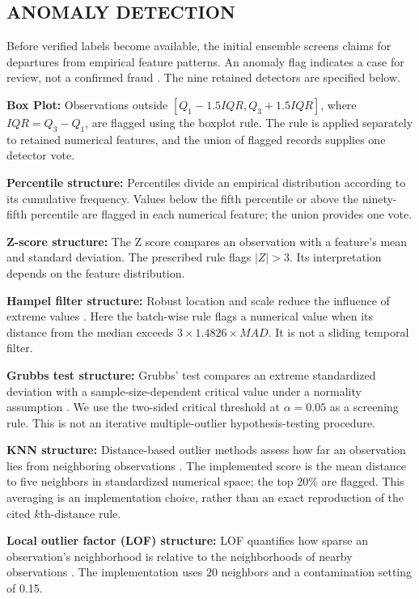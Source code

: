 \subsection*{ANOMALY DETECTION}\label{SSC:AD}
Before verified labels become available, the initial ensemble screens
claims for departures from empirical feature patterns. An anomaly flag
indicates a case for review, not a confirmed fraud \citep{Chandola2009}.
The nine retained detectors are specified below.

\textbf{Box Plot:} Observations outside
$[Q_1-1.5IQR,Q_3+1.5IQR]$, where $IQR=Q_3-Q_1$, are flagged
using the boxplot rule. The rule is applied separately to retained numerical
features, and the union of flagged records supplies one detector vote.

\textbf{Percentile structure:} Percentiles divide an empirical distribution
according to its cumulative frequency. Values below the fifth percentile
or above the ninety-fifth percentile are flagged in each numerical feature;
the union provides one vote.

\textbf{Z-score structure:} The Z score compares an observation with a
feature's mean and standard deviation. The prescribed rule flags
$|Z|>3$. Its interpretation depends on the feature distribution.

\textbf{Hampel filter structure:} Robust location and scale reduce the
influence of extreme values \citep{Hampel1974}. Here the batch-wise rule
flags a numerical value when its distance from the median exceeds
$3\times1.4826\times MAD$. It is not a sliding temporal filter.

\textbf{Grubbs test structure:} Grubbs' test compares an extreme standardized
deviation with a sample-size-dependent critical value under a normality
assumption \citep{Grubbs1969}. We use the two-sided critical threshold at
$\alpha=0.05$ as a screening rule. This is not an iterative multiple-outlier
hypothesis-testing procedure.

\textbf{KNN structure:} Distance-based outlier methods assess how far an
observation lies from neighboring observations \citep{Ramaswamy2000}.
The implemented score is the mean distance to five neighbors in standardized
numerical space; the top 20\% are flagged. This averaging is an implementation
choice, rather than an exact reproduction of the cited $k$th-distance rule.

\textbf{Local outlier factor (LOF) structure:} LOF quantifies how sparse an observation's neighborhood is relative
to the neighborhoods of nearby observations \citep{Breunig2000}.
The implementation uses 20 neighbors and a contamination setting of 0.15.

